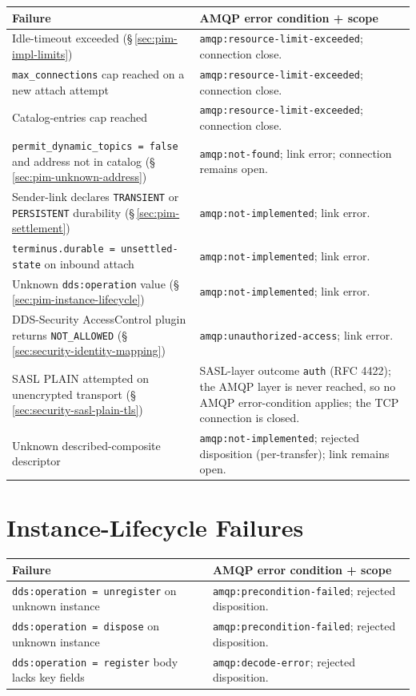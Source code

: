 \documentclass{../styles/zerodds-vendor-spec}
\begin{document}
\begin{longtable}{p{4.0cm}p{8.0cm}}
  \toprule
  \textbf{Failure} & \textbf{AMQP error condition + scope} \\
  \midrule
  \endhead
  Idle-timeout exceeded (\S\,\ref{sec:pim-impl-limits}) & \texttt{amqp:resource-limit-exceeded}; connection close. \\
  \texttt{max\_connections} cap reached on a new attach attempt & \texttt{amqp:resource-limit-exceeded}; connection close. \\
  Catalog-entries cap reached & \texttt{amqp:resource-limit-exceeded}; connection close. \\
  \texttt{permit\_dynamic\_topics = false} and address not in catalog (\S\,\ref{sec:pim-unknown-address}) & \texttt{amqp:not-found}; link error; connection remains open. \\
  Sender-link declares \texttt{TRANSIENT} or \texttt{PERSISTENT} durability (\S\,\ref{sec:pim-settlement}) & \texttt{amqp:not-implemented}; link error. \\
  \texttt{terminus.durable = unsettled-state} on inbound attach & \texttt{amqp:not-implemented}; link error. \\
  Unknown \texttt{dds:operation} value (\S\,\ref{sec:pim-instance-lifecycle}) & \texttt{amqp:not-implemented}; link error. \\
  DDS-Security AccessControl plugin returns \texttt{NOT\_ALLOWED} (\S\,\ref{sec:security-identity-mapping}) & \texttt{amqp:unauthorized-access}; link error. \\
  SASL PLAIN attempted on unencrypted transport (\S\,\ref{sec:security-sasl-plain-tls}) & SASL-layer outcome \texttt{auth} (RFC 4422); the AMQP layer is never reached, so no AMQP error-condition applies; the TCP connection is closed. \\
  Unknown described-composite descriptor & \texttt{amqp:not-implemented}; rejected disposition (per-transfer); link remains open. \\
  \bottomrule
\end{longtable}

\section{Instance-Lifecycle Failures}

\begin{longtable}{p{4.0cm}p{8.0cm}}
  \toprule
  \textbf{Failure} & \textbf{AMQP error condition + scope} \\
  \midrule
  \endhead
  \texttt{dds:operation = unregister} on unknown instance & \texttt{amqp:precondition-failed}; rejected disposition. \\
  \texttt{dds:operation = dispose} on unknown instance & \texttt{amqp:precondition-failed}; rejected disposition. \\
  \texttt{dds:operation = register} body lacks key fields & \texttt{amqp:decode-error}; rejected disposition. \\
  \bottomrule
\end{longtable}
\end{document}
